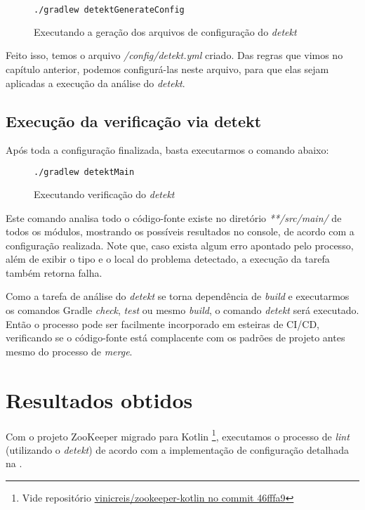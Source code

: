 \begin{figure}[H]
    \begin{lstlisting}[language=Bash,numbers = none]
./gradlew detektGenerateConfig
    \end{lstlisting}
    \caption{Executando a geração dos arquivos de configuração do \textit{detekt}}
    \label{fig:generating_detekt_config}
\end{figure}

Feito isso, temos o arquivo \textit{/config/detekt.yml} criado. Das regras que vimos no capítulo anterior, podemos configurá-las neste arquivo, para que elas sejam aplicadas a execução da análise do \textit{detekt}.

\subsection{Execução da verificação via detekt}

Após toda a configuração finalizada, basta executarmos o comando abaixo:

\begin{figure}[H]
    \begin{lstlisting}[language=Bash,numbers = none]
./gradlew detektMain
    \end{lstlisting}
    \caption{Executando verificação do \textit{detekt}}
    \label{fig:running_detekt}
\end{figure}

Este comando analisa todo o código-fonte existe no diretório \textit{**/src/main/} de todos os módulos, mostrando os possíveis resultados no console, de acordo com a configuração realizada. Note que, caso exista algum erro apontado pelo processo, além de exibir o tipo e o local do problema detectado, a execução da tarefa também retorna falha.

Como a tarefa de análise do \textit{detekt} se torna dependência de \textit{build} e executarmos os comandos Gradle \textit{check}, \textit{test} ou mesmo \textit{build}, o comando \textit{detekt} será executado. Então o processo pode ser facilmente incorporado em esteiras de CI/CD, verificando se o código-fonte está complacente com os padrões de projeto antes mesmo do processo de \textit{merge}.

\section{Resultados obtidos}

Com o projeto ZooKeeper migrado para Kotlin \footnote{Vide repositório \href{https://github.com/vinicreis/zookeeper-kotlin/tree/46fffa9bf96b8e13da71dfdf6a47ae5dc876c758}{vinicreis/zookeeper-kotlin no commit 46fffa9}}, executamos o processo de \textit{lint} (utilizando o \textit{detekt}) de acordo com a implementação de configuração detalhada na .

